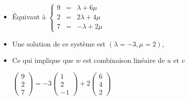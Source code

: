 \begin{frame}
\begin{exemple}
\begin{itemize}
  \pause
  
  \item \'Equivaut à $\left\{
\begin{array}{rcl}
9 & = & \lambda + 6\mu\\ 2 & = & 2\lambda + 4\mu\\ 7 & = & -\lambda + 2\mu 
\end{array}\right.
$
  
  \pause
  \item Une solution de ce système est $(\lambda = -3, \mu = 2)$,
  \pause
  \item Ce qui implique que $w$ est combinaison linéaire de $u$ et $v$

\medskip
\pause
\hfil $\left(\begin{smallmatrix}9\\2\\7\end{smallmatrix}\right)
=  -3\left(\begin{smallmatrix}1\\2\\-1\end{smallmatrix}\right) 
+ 2\left(\begin{smallmatrix}6\\4\\2\end{smallmatrix}\right)$
\end{itemize}
\end{exemple}
\end{frame}


